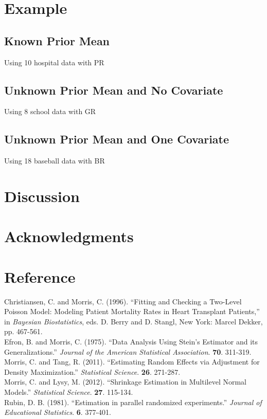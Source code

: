 \documentclass[article]{jss}
\begin{document}
\section[Example]{Example}
\subsection[Known Prior Mean]{Known Prior Mean}
Using 10 hospital data with PR
\subsection[Unknown Prior Mean and No Covariate]{Unknown Prior Mean and No Covariate}
Using 8 school data with GR
\subsection[Unknown Prior Mean and One Covariate]{Unknown Prior Mean and One Covariate}
Using 18 baseball data with BR

\section[Discussion]{Discussion}

\section[acknowledgments]{Acknowledgments}

\section[Reference]{Reference}
Christiansen, C. and Morris, C. (1996). ``Fitting and Checking a Two-Level Poisson Model: Modeling Patient Mortality Rates in Heart Transplant Patients,'' in \emph{Bayesian Biostatistics}, eds. D. Berry and D. Stangl, New York: Marcel Dekker, pp. 467-561.
\\
Efron, B. and Morris, C. (1975). ``Data Analysis Using Stein's Estimator and its Generalizations.'' \emph{Journal of the American Statistical Association}. \textbf{70}. 311-319.
\\
Morris, C. and Tang, R. (2011). ``Estimating Random Effects via Adjustment for Density Maximization.'' \emph{Statistical Science}. \textbf{26}. 271-287.
\\
Morris, C. and Lysy, M. (2012). ``Shrinkage Estimation in Multilevel Normal Models.'' \emph{Statistical Science}. \textbf{27}. 115-134.
\\
Rubin, D. B. (1981). ``Estimation in parallel randomized
  experiments.'' \emph{Journal of Educational Statistics}. \textbf{6}. 377-401.
\\
\end{document}
